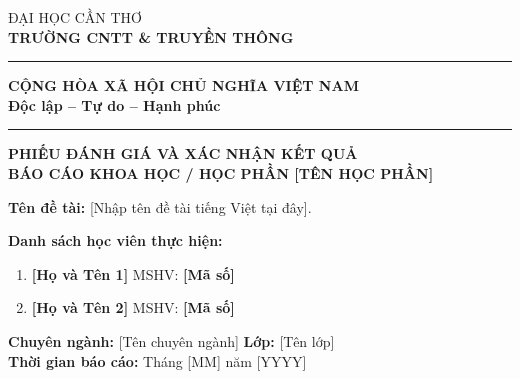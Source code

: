
\noindent
\begin{minipage}[t]{0.48\textwidth}
\raggedright
{\fontsize{11bp}{14bp}\selectfont
ĐẠI HỌC CẦN THƠ\\[0.3ex]
\textbf{TRƯỜNG CNTT \& TRUYỀN THÔNG}\\[-1.2ex]
\hspace*{0.5cm}\rule{3.2cm}{0.4pt}
}
\end{minipage}
\hfill
\begin{minipage}[t]{0.50\textwidth}
\raggedleft
{\fontsize{11bp}{14bp}\selectfont
\begin{center}
\textbf{CỘNG HÒA XÃ HỘI CHỦ NGHĨA VIỆT NAM\\[0.3ex]
Độc lập -- Tự do -- Hạnh phúc}\\
\noindent\rule{4cm}{0.4pt}
\end{center}
}
\end{minipage}

\vspace{1.5cm}

\begin{center}
  {\fontsize{14bp}{17bp}\selectfont \textbf{PHIẾU ĐÁNH GIÁ VÀ XÁC NHẬN KẾT QUẢ}}\\
  {\fontsize{13bp}{16bp}\selectfont \textbf{BÁO CÁO KHOA HỌC / HỌC PHẦN [TÊN HỌC PHẦN]}}
\end{center}

\vspace{0.8cm}

\noindent\textbf{Tên đề tài:} [Nhập tên đề tài tiếng Việt tại đây].

\vspace{0.4cm}
\noindent\textbf{Danh sách học viên thực hiện:}
\begin{enumerate}[leftmargin=2.5cm,itemsep=1pt]
  \item \textbf{[Họ và Tên 1]} \hspace{1cm} MSHV: \textbf{[Mã số]}
  \item \textbf{[Họ và Tên 2]} \hspace{1cm} MSHV: \textbf{[Mã số]}
\end{enumerate}
\noindent\textbf{Chuyên ngành:} [Tên chuyên ngành] \hspace{2.5cm} \textbf{Lớp:} [Tên lớp]\\
\textbf{Thời gian báo cáo:} Tháng [MM] năm [YYYY]


